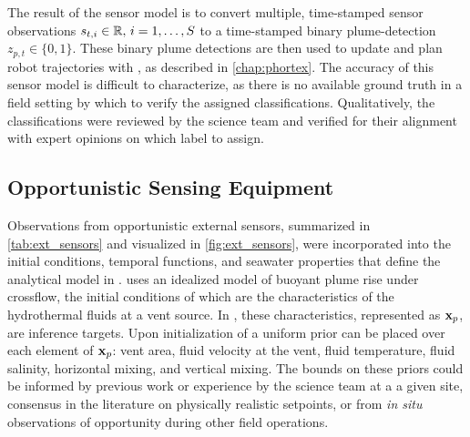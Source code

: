 The result of the sensor model is to convert multiple, time-stamped sensor observations $s_{t, i} \in \mathbb{R}, \, i = 1, \dots, S$ to a time-stamped binary plume-detection $z_{p, t} \in \{0, 1\}$. These binary plume detections are then used to update \PHUMES and plan robot trajectories with \PHORTEX, as described in \cref{chap:phortex}. The accuracy of this sensor model is difficult to characterize, as there is no available ground truth in a field setting by which to verify the assigned classifications. Qualitatively, the classifications were reviewed by the science team and verified for their alignment with expert opinions on which label to assign.


\subsection{Opportunistic Sensing Equipment}
\label{sec:external_current}
Observations from opportunistic external sensors, summarized in \cref{tab:ext_sensors} and visualized in \cref{fig:ext_sensors}, were incorporated into the initial conditions, temporal functions, and seawater properties that define the analytical model in \PHUMES. \PHUMES uses an idealized model of buoyant plume rise under crossflow, the initial conditions of which are the characteristics of the hydrothermal fluids at a vent source. In \PHUMES, these characteristics, represented as $\mathbf{x}_p$, are inference targets. Upon initialization of \PHUMES a uniform prior can be placed over each element of $\mathbf{x}_p$: vent area, fluid velocity at the vent, fluid temperature, fluid salinity, horizontal mixing, and vertical mixing. The bounds on these priors could be informed by previous work or experience by the science team at a a given site, consensus in the literature on physically realistic setpoints, or from \emph{in situ} observations of opportunity during other field operations.

